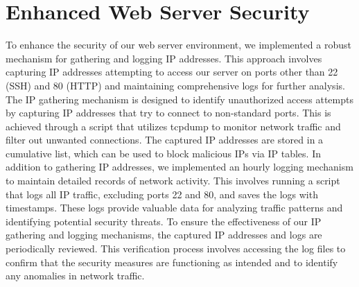 \section{Enhanced Web Server Security}

To enhance the security of our web server environment, we implemented a robust mechanism for gathering and logging IP addresses. This approach involves capturing IP addresses attempting to access our server on ports other than 22 (SSH) and 80 (HTTP) and maintaining comprehensive logs for further analysis. The IP gathering mechanism is designed to identify unauthorized access attempts by capturing IP addresses that try to connect to non-standard ports. This is achieved through a script that utilizes tcpdump to monitor network traffic and filter out unwanted connections. The captured IP addresses are stored in a cumulative list, which can be used to block malicious IPs via IP tables. In addition to gathering IP addresses, we implemented an hourly logging mechanism to maintain detailed records of network activity. This involves running a script that logs all IP traffic, excluding ports 22 and 80, and saves the logs with timestamps. These logs provide valuable data for analyzing traffic patterns and identifying potential security threats. To ensure the effectiveness of our IP gathering and logging mechanisms, the captured IP addresses and logs are periodically reviewed. This verification process involves accessing the log files to confirm that the security measures are functioning as intended and to identify any anomalies in network traffic.
